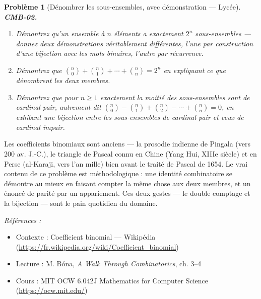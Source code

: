 \documentclass[11pt]{article}
\newtheorem{problem}{Problème}
\newenvironment{refs}{\par\small\noindent\emph{Références :}\begin{itemize}\setlength\itemsep{0pt}}{\end{itemize}\normalsize}
\begin{document}
\begin{problem}[{Dénombrer les sous-ensembles, avec démonstration --- Lycée}]
\textbf{CMB-02.} \begin{enumerate}
\item[(a)] Démontrez qu'un ensemble à $ n $ éléments a exactement $ 2^n $ sous-ensembles --- donnez
deux démonstrations véritablement différentes, l'une par construction d'une bijection avec les
mots binaires, l'autre par récurrence.
\item[(b)] Démontrez que $ \binom{n}{0} + \binom{n}{1} + \cdots + \binom{n}{n} = 2^n $ en expliquant
ce que dénombrent les deux membres.
\item[(c)] Démontrez que pour $ n \ge 1 $ exactement la moitié des sous-ensembles sont de cardinal
pair, autrement dit $ \binom{n}{0} - \binom{n}{1} + \binom{n}{2} - \cdots \pm \binom{n}{n} = 0 $,
en exhibant une bijection entre les sous-ensembles de cardinal pair et ceux de cardinal
impair.
\end{enumerate}

\end{problem}

\noindent Les coefficients binomiaux sont anciens --- la prosodie indienne de Pingala
(vers 200 av. J.-C.), le triangle \og{} de Pascal \fg{} connu en Chine (Yang Hui, XIIIe siècle)
et en Perse (al-Karaji, vers l'an mille) bien avant le traité de Pascal de 1654. Le vrai contenu
de ce problème est méthodologique : une identité combinatoire se démontre au mieux en faisant
compter la même chose aux deux membres, et un énoncé de parité par un appariement. Ces deux
gestes --- le double comptage et la bijection --- sont le pain quotidien du domaine.

\begin{refs}
\item Contexte : Coefficient binomial --- Wikipédia (\url{https://fr.wikipedia.org/wiki/Coefficient_binomial})
\item Lecture : M. Bóna, \textit{A Walk Through Combinatorics}, ch. 3--4
\item Cours : MIT OCW 6.042J Mathematics for Computer Science (\url{https://ocw.mit.edu/})
\end{refs}

\bigskip
\end{document}
